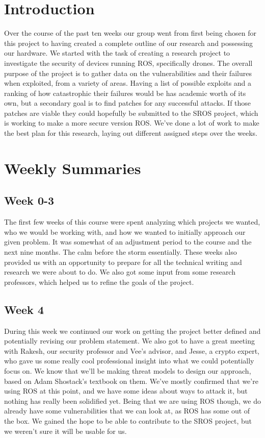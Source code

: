 \documentclass[IEEEtran,letterpaper,10pt,notitlepage,draftclsnofoot,onecolumn]{article}
\begin{document}
\newpage
{}
\tableofcontents
\clearpage

\section{Introduction}
Over the course of the past ten weeks our group went from first being chosen for this project to having created a complete outline of our research and possessing our hardware.
We started with the task of creating a research project to investigate the security of devices running ROS, specifically drones.
The overall purpose of the project is to gather data on the vulnerabilities and their failures when exploited, from a variety of areas.
Having a list of possible exploits and a ranking of how catastrophic their failures would be has academic worth of its own, but a secondary goal is to find patches for any successful attacks.
If those patches are viable they could hopefully be submitted to the SROS project, which is working to make a more secure version ROS.
We've done a lot of work to make the best plan for this research, laying out different assigned steps over the weeks.

\section{Weekly Summaries}
\subsection{Week 0-3}
The first few weeks of this course were spent analyzing which projects we wanted, who we would be working with, and how we wanted to initially approach our given problem.
It was somewhat of an adjustment period to the course and the next nine months. The calm before the storm essentially.
These weeks also provided us with an opportunity to prepare for all the technical writing and research we were about to do.
We also got some input from some research professors, which helped us to refine the goals of the project.

\subsection{Week 4}
During this week we continued our work on getting the project better defined and potentially revising our problem statement.
We also got to have a great meeting with Rakesh, our security professor and Vee's advisor, and Jesse, a crypto expert, who gave us some really cool professional insight into what we could potentially focus on.
We know that we'll be making threat models to design our approach, based on Adam Shostack's textbook on them. \cite{TMDS}
We've mostly confirmed that we're using ROS at this point, and we have some ideas about ways to attack it, but nothing has really been solidified yet.
Being that we are using ROS though, we do already have some vulnerabilities that we can look at, as ROS has some out of the box.
We gained the hope to be able to contribute to the SROS project, but we weren't sure it will be usable for us.
\end{document}
